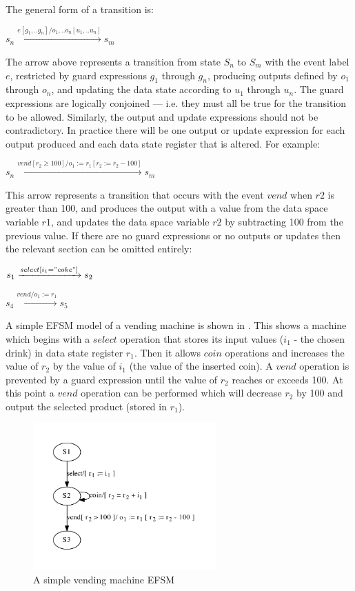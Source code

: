 The general form of a transition is: 

\begin{center}
$s_n \xrightarrow{e[g_1, .. g_n]/o_1, .. o_n[u_1, .. u_n]} s_m$ 
\end{center}

The arrow above represents a transition from state $S_n$ to $S_m$ with the event label $e$, restricted by guard expressions $g_1$ through $g_n$, producing outputs defined by $o_1$ through $o_n$, and updating the data state according to $u_1$ through $u_n$. The guard expressions are logically conjoined --- i.e. they must all be true for the transition to be allowed. Similarly, the output and update expressions should not be contradictory. In practice there will be one output or update expression for each output produced and each data state register that is altered. For example:

\begin{center}
$s_n \xrightarrow{vend[r_{2} \geq 100]/o_{1} :=r_{1}[r_{2} := r_{2} - 100]} s_m$
\end{center}

This arrow represents a transition that occurs with the event $vend$ when $r2$ is greater than 100, and produces the output with a value from the data space variable $r1$, and updates the data space variable $r2$ by subtracting 100 from the previous value. If there are no guard expressions or no outputs or updates then the relevant section can be omitted entirely:

\begin{center}
$s_1 \xrightarrow{select[i_{1}="coke"]} s_2$

$s_4 \xrightarrow{vend/o_{1} := r_{1}} s_5$
\end{center}

A simple EFSM model of a vending machine is shown in . This shows a machine which begins with a $select$ operation that stores its input values ($i_1$ - the chosen drink) in data state register $r_1$. Then it allows $coin$ operations and increases the value of $r_2$ by the value of $i_1$ (the value of the inserted coin). A $vend$ operation is prevented by a guard expression until the value of $r_2$ reaches or exceeds 100. At this point a $vend$ operation can be performed which will decrease $r_2$ by 100 and output the selected product (stored in $r_1$).

\begin{figure}[h]
\begin{center}
\includegraphics[width=7cm]{figures/efsm/vend-real.pdf}
\caption{A simple vending machine EFSM}
\label{fig:vendsimple}
\end{center}
\end{figure}

